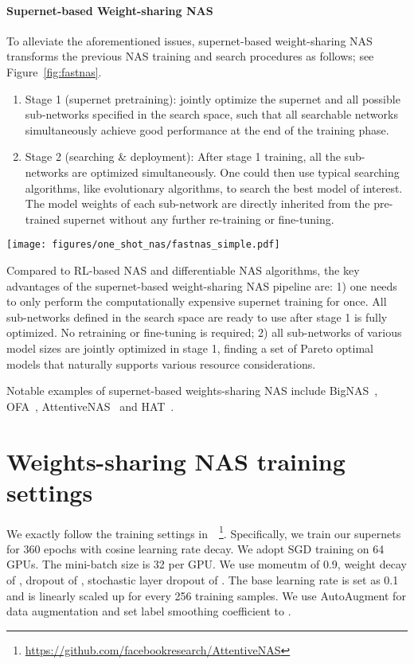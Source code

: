 \documentclass{article}
\begin{document}
\paragraph{Supernet-based Weight-sharing NAS}
To alleviate the aforementioned issues, supernet-based  weight-sharing NAS transforms the previous NAS training and search procedures as follows; see Figure~\ref{fig:fastnas}.
\begin{enumerate}
\item[1)] Stage 1  (supernet pretraining): jointly optimize the supernet and all possible sub-networks specified in the search space, such that all searchable networks simultaneously achieve good performance at the end of the training phase.

\item[2)]  Stage 2 (searching \& deployment): 
After stage 1 training, all the sub-networks are optimized simultaneously. 
One could then use typical searching algorithms, like evolutionary algorithms, to search the best model of interest. The model weights of each sub-network are directly inherited from the pre-trained supernet without any further re-training or fine-tuning.
\end{enumerate}

\begin{figure*}[h]
    \centering
    \texttt{[image: figures/one\_shot\_nas/fastnas\_simple.pdf]}
    \caption{An overview of supernet-based weight-sharing NAS.}
    \label{fig:fastnas}
\end{figure*}


Compared to RL-based NAS and differentiable NAS algorithms, the key advantages of the supernet-based weight-sharing NAS pipeline are: 1) one needs to only perform the computationally expensive supernet training for once. All sub-networks defined in the search space are ready to use after stage 1 is fully optimized. No retraining or fine-tuning is required;
2) all sub-networks of various model sizes are jointly optimized in stage 1, finding a set of Pareto optimal models that naturally supports various resource considerations. 

Notable examples of supernet-based weights-sharing NAS include
BigNAS~\citep{yu2020bignas}, OFA~\citep{cai2019once}, AttentiveNAS~\citep{wang2020attentivenas} and HAT~\citep{wang2020hat}.


\section{Weights-sharing NAS training settings}
\label{app:supernet}
We exactly follow the training settings in~\citet{wang2020attentivenas}~\footnote{\url{https://github.com/facebookresearch/AttentiveNAS}}. 
Specifically, 
we train our supernets for 360 epochs with cosine learning rate decay. 
We adopt SGD training on 64 GPUs. The mini-batch size is 32 per GPU. 
We use momeutm of 0.9, weight decay of , dropout of , stochastic layer dropout of . 
The base learning rate is set as 0.1 and is linearly scaled up for every 256 training samples. 
We use  AutoAugment \cite{cubuk2018autoaugment}  for data augmentation and set label smoothing coefficient to .
\end{document}
